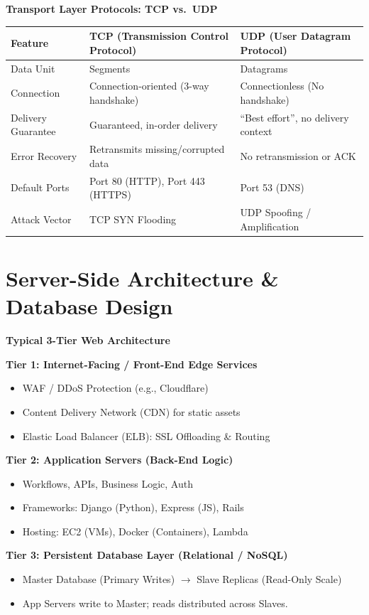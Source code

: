 \documentclass[8pt, a4paper]{article}
\begin{document}
\begin{conceptbox}
\textbf{Transport Layer Protocols: TCP vs.\ UDP}

\smallskip
\begin{tabularx}{\linewidth}{l X X}
  \toprule
  \textbf{Feature} & \textbf{TCP (Transmission Control Protocol)} & \textbf{UDP (User Datagram Protocol)} \\
  \midrule
  Data Unit          & Segments                                      & Datagrams \\
  Connection         & Connection-oriented (3-way handshake)         & Connectionless (No handshake) \\
  Delivery Guarantee & Guaranteed, in-order delivery                 & ``Best effort'', no delivery context \\
  Error Recovery     & Retransmits missing/corrupted data            & No retransmission or ACK \\
  Default Ports      & Port 80 (HTTP), Port 443 (HTTPS)              & Port 53 (DNS) \\
  Attack Vector      & TCP SYN Flooding                              & UDP Spoofing / Amplification \\
  \bottomrule
\end{tabularx}
\end{conceptbox}

\section{Server-Side Architecture \& Database Design}

\begin{conceptbox}
\textbf{Typical 3-Tier Web Architecture}

\medskip
\textbf{Tier 1: Internet-Facing / Front-End Edge Services}
\begin{itemize}
  \item WAF / DDoS Protection (e.g., Cloudflare)
  \item Content Delivery Network (CDN) for static assets
  \item Elastic Load Balancer (ELB): SSL Offloading \& Routing
\end{itemize}

\textbf{Tier 2: Application Servers (Back-End Logic)}
\begin{itemize}
  \item Workflows, APIs, Business Logic, Auth
  \item Frameworks: Django (Python), Express (JS), Rails
  \item Hosting: EC2 (VMs), Docker (Containers), Lambda
\end{itemize}

\textbf{Tier 3: Persistent Database Layer (Relational / NoSQL)}
\begin{itemize}
  \item Master Database (Primary Writes) $\longrightarrow$ Slave Replicas (Read-Only Scale)
  \item App Servers write to Master; reads distributed across Slaves.
\end{itemize}
\end{conceptbox}
\end{document}
